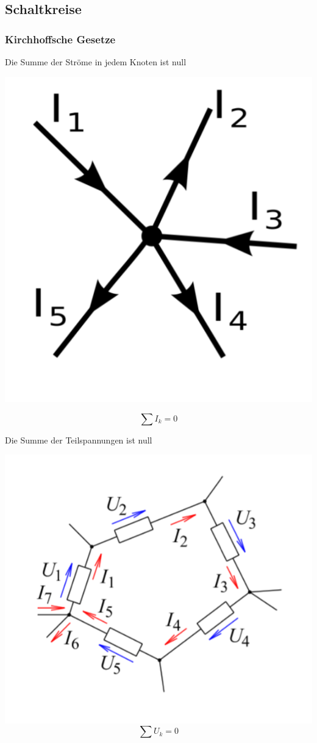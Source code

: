 \subsection{Schaltkreise}

\subsubsection{Kirchhoffsche Gesetze}
Die Summe der Ströme in jedem Knoten ist null

\includegraphics[scale=.3]{images/kirch1.PNG}

$$ \sum I_{k} = 0 $$

Die Summe der Teilspannungen ist null 

\includegraphics[scale=.3]{images/kirch2.PNG}
$$ \sum U_{k} = 0 $$

